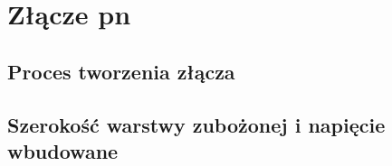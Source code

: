 \chapter{Złącze pn}
    \section{Proces tworzenia złącza}
    \section{Szerokość warstwy zubożonej i napięcie wbudowane}